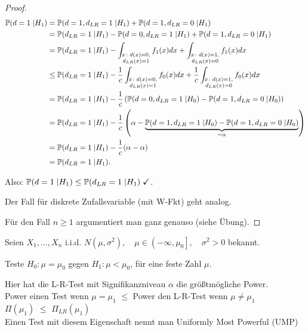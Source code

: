 \documentclass{tstextbook}
\begin{document}
\begin{proof}
	\[
	\begin{aligned}
		\mathbb P(d=1\;|H_1) & = \mathbb P(d=1,d_{LR}=1\;|H_1) + \mathbb P(d=1,d_{LR}=0\;|H_1) \\
		& = \mathbb P(d_{LR}=1\;|H_1)-\mathbb P(d=0,d_{LR}=1\;|H_1) + \mathbb P(d=1,d_{LR}=0\;|H_1) \\
		& = \mathbb P(d_{LR}=1\;|H_1) - \int_{\substack{x\colon d(x)=0, \\ d_{LR}(x)=1}} f_1(x) dx + \int_{\substack{x\colon d(x)=1, \\ d_{LR}(x)=0}} f_1(x) dx \\
		& \le \mathbb P(d_{LR}=1\;|H_1) - \frac{1}{c}\int_{\substack{x\colon d(x)=0, \\ d_{LR}(x)=1}} f_0(x) dx + \frac{1}{c}\int_{\substack{x\colon d(x)=1, \\ d_{LR}(x)=0}} f_0(x) dx \\
		& = \mathbb P(d_{LR}=1\;|H_1) - \frac{1}{c}\left(\mathbb P(d=0,d_{LR}=1\;|H_0)-\mathbb P(d=1,d_{LR}=0\;|H_0)\right) \\
		& = \mathbb P(d_{LR}=1\;|H_1) - \frac{1}{c}\left( \alpha - \underbrace{\mathbb P(d=1,d_{LR}=1\;|H_0)-\mathbb P(d=1,d_{LR}=0\;|H_0)}_{=\alpha} \right) \\
		& = \mathbb P(d_{LR}=1\;|H_1) - \frac{1}{c} ( \alpha - \alpha) \\
		& = \mathbb P(d_{LR} =1\;|H_1). \\
	\end{aligned}
	\]
	
	Also: $ \mathbb P(d=1\;|H_1)\le\mathbb P(d_{LR}=1\;|H_1) \;\checkmark $.
	
	Der Fall für diskrete Zufallsvariable (mit W-Fkt) geht analog.
	
	Für den Fall $ n\ge 1 $ argumentiert man ganz genauso (siehe Übung).
	
\end{proof}

\begin{corollary}
	Seien $ X_1,\ldots,X_n $ i.i.d. $ N(\mu,\sigma^2), \quad \mu \in \left(-\infty,\mu_0\right], \quad \sigma^2 > 0  $ bekannt.
	
	Teste $ H_0\colon \mu=\mu_0 $ gegen $ H_1\colon \mu < \mu_0 $, für eine feste Zahl $\mu$.
	
	Hier hat die L-R-Test mit Signifikanzniveau $ \alpha $ die größtmögliche Power. \\
	
	Power einen Test wenn $\mu=\mu_1$ $\leq$ Power den L-R-Test wenn $\mu \neq \mu_1$ \\
	 $ \Pi (\mu_1)$ $\leq$  $\Pi_{LR} (\mu_1)$\\
	 
	 Einen Test mit diesem Eigenschaft nennt man Uniformly Most Powerful  (UMP)
	
\end{corollary}
\end{document}
